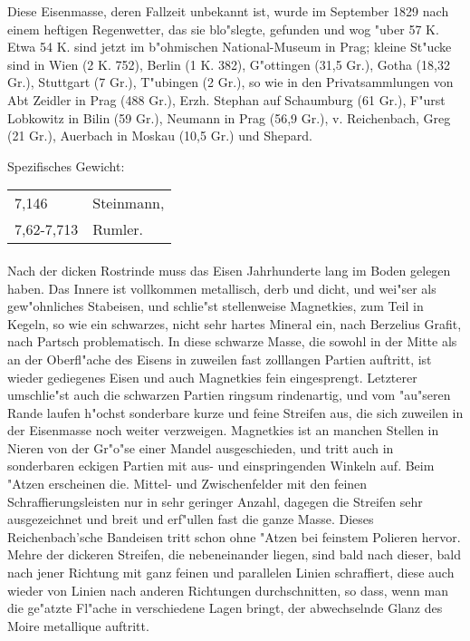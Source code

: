 \documentclass[a4paper, 11pt, oneside]{article}
\begin{document}
Diese Eisenmasse, deren Fallzeit unbekannt ist, wurde im September 1829 nach einem heftigen Regenwetter, das sie blo"slegte, gefunden und wog "uber 57 K. Etwa 54 K. sind jetzt im b"ohmischen National-Museum in Prag; kleine St"ucke sind in Wien (2 K. 752), Berlin (1 K. 382), G"ottingen (31,5 Gr.), Gotha (18,32 Gr.), Stuttgart (7 Gr.), T"ubingen (2 Gr.), so wie in den Privatsammlungen von Abt Zeidler in Prag (488 Gr.), Erzh. Stephan auf Schaumburg (61 Gr.), F"urst Lobkowitz in Bilin (59 Gr.), Neumann in Prag (56,9 Gr.), v. Reichenbach, Greg (21 Gr.), Auerbach in Moskau (10,5 Gr.) und Shepard.

Spezifisches Gewicht:  
\begin{table}[!ht]
    \centering
    \begin{tabular}{l l}
        7,146 & Steinmann,\\
        7,62-7,713 & Rumler.
    \end{tabular}
\end{table}
\paragraph{}
Nach der dicken Rostrinde muss das Eisen Jahrhunderte lang im Boden gelegen haben. Das Innere ist vollkommen metallisch, derb und dicht, und wei"ser als gew"ohnliches Stabeisen, und schlie"st stellenweise Magnetkies, zum Teil in Kegeln, so wie ein schwarzes, nicht sehr hartes Mineral ein, nach Berzelius Grafit, nach Partsch problematisch. In diese schwarze Masse, die sowohl in der Mitte als an der Oberfl"ache des Eisens in zuweilen fast zolllangen Partien auftritt, ist wieder gediegenes Eisen und auch Magnetkies fein eingesprengt. Letzterer umschlie"st auch die schwarzen Partien ringsum rindenartig, und vom "au"seren Rande laufen h"ochst sonderbare kurze und feine Streifen aus, die sich zuweilen in der Eisenmasse noch weiter verzweigen. Magnetkies ist an manchen Stellen in Nieren von der Gr"o"se einer Mandel ausgeschieden, und tritt auch in sonderbaren eckigen Partien mit aus- und einspringenden Winkeln auf. Beim "Atzen erscheinen die. Mittel- und Zwischenfelder mit den feinen Schraffierungsleisten nur in sehr geringer Anzahl, dagegen die Streifen sehr ausgezeichnet und breit und erf"ullen fast die ganze Masse. Dieses Reichenbach'sche Bandeisen tritt schon ohne "Atzen bei feinstem Polieren hervor. Mehre der dickeren Streifen, die nebeneinander liegen, sind bald nach dieser, bald nach jener Richtung mit ganz feinen und parallelen Linien schraffiert, diese auch wieder von Linien nach anderen Richtungen durchschnitten, so dass, wenn man die ge"atzte Fl"ache in verschiedene Lagen bringt, der abwechselnde Glanz des Moire metallique auftritt.
\end{document}
